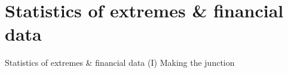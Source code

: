 \documentclass{beamer}
\begin{document}
\section{Statistics of extremes \& financial data}
\begin{frame}{Statistics of extremes \& financial data (I)}
	Making the junction
\end{frame}








\end{document}
